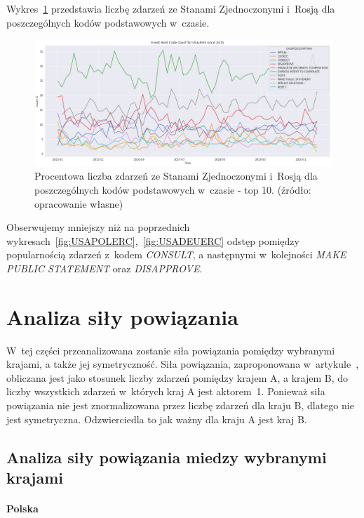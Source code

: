 \documentclass[11pt]{report}
\begin{document}
    Wykres~\ref{fig:USARUSERC} przedstawia liczbę zdarzeń ze Stanami Zjednoczonymi i~Rosją dla poszczególnych kodów podstawowych w~czasie.
    \begin{figure}[!htp]
        \centering
        \includegraphics[width=\linewidth]{fig/USA/USARUSERCperc.png}
        \caption{Procentowa liczba zdarzeń ze Stanami Zjednoczonymi i~Rosją dla poszczególnych kodów podstawowych w~czasie - top 10. (źródło: opracowanie własne)}
        \label{fig:USARUSERC}
    \end{figure}
    Obserwujemy mniejszy niż na poprzednich wykresach~\ref{fig:USAPOLERC},~\ref{fig:USADEUERC} odstęp pomiędzy popularnością zdarzeń z~kodem \textit{CONSULT}, a następnymi w~kolejności \textit{MAKE PUBLIC STATEMENT} oraz \textit{DISAPPROVE}.


    \section{Analiza siły powiązania}\label{sec:analiza-siły-powiązania}
    W~tej części przeanalizowana zostanie siła powiązania pomiędzy wybranymi krajami, a także jej symetryczność.
    Siła powiązania, zaproponowana w~artykule~\cite{Yuan2017}, obliczana jest jako stosunek liczby zdarzeń pomiędzy krajem A, a krajem B, do liczby wszystkich zdarzeń w~których kraj A jest aktorem~1.
    Ponieważ siła powiązania nie jest znormalizowana przez liczbę zdarzeń dla kraju B, dlatego nie jest symetryczna.
    Odzwierciedla to jak ważny dla kraju A jest kraj B.

    \subsection{Analiza siły powiązania miedzy wybranymi krajami}

    \paragraph{Polska}
\end{document}
